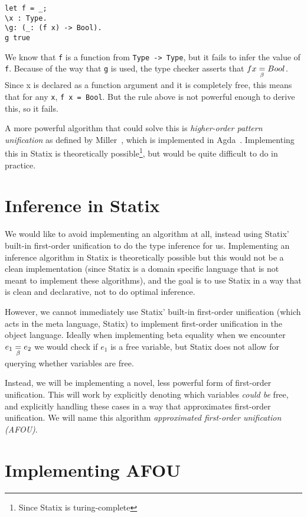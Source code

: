 \begin{lstlisting}
let f = _;
\x : Type.
\g: (_: (f x) -> Bool).
g true
\end{lstlisting}

We know that \verb|f| is a function from \verb|Type -> Type|, but it fails to infer the value of \verb|f|. Because of the way that \verb|g| is used, the type checker asserts that $f x \underset{\beta}{=} Bool$. Since x is declared as a function argument and it is completely free, this means that for any \verb|x|, \verb|f x = Bool|. But the rule above is not powerful enough to derive this, so it fails.

A more powerful algorithm that could solve this is \emph{higher-order pattern unification} as defined by Miller~\cite{Miller89}, which is implemented in Agda~\cite{agda}. Implementing this in Statix is theoretically possible\footnote{Since Statix is turing-complete}, but would be quite difficult to do in practice.

\section{Inference in Statix}
\label{statix-inference}

We would like to avoid implementing an algorithm at all, instead using Statix' built-in first-order unification to do the type inference for us. Implementing an inference algorithm in Statix is theoretically possible but this would not be a clean implementation (since Statix is a domain specific language that is not meant to implement these algorithms), and the goal is to use Statix in a way that is clean and declarative, not to do optimal inference.

However, we cannot immediately use Statix' built-in first-order unification (which acts in the meta language, Statix) to implement first-order unification in the object language. Ideally when implementing beta equality when we encounter $e_1 \underset{\beta}{=} e_2$ we would check if $e_1$ is a free variable, but Statix does not allow for querying whether variables are free. 

Instead, we will be implementing a novel, less powerful form of first-order unification. This will work by explicitly denoting which variables \emph{could be} free, and explicitly handling these cases in a way that approximates first-order unification. We will name this algorithm \emph{approximated first-order unification (AFOU)}.

\section{Implementing AFOU}
\label{implementing-inference}

